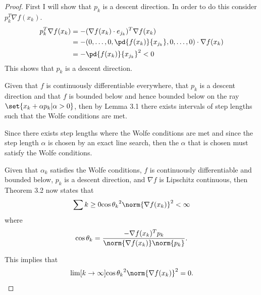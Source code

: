 \documentclass[11pt, oneside]{article}
\begin{document}
\begin{enumerate}
\begin{enumerate}
        \begin{proof}
          First I will show that $p_k$ is a descent direction.
          In order to do this consider $p_k^T \nabla f(x_k)$.
          \begin{align*}
            p_k^T \nabla f(x_k) &= - (\nabla f(x_k) \cdot e_{j_k})^T \nabla f(x_k) \\
            &= -(0, \ldots, 0, \pd{f(x_k)}{x_{j_k}}, 0, \ldots, 0) \cdot \nabla f(x_k) \\
            &= - \pd{f(x_k)}{x_{j_k}}^2 < 0
          \end{align*}
          This shows that $p_k$ is a descent direction.

          Given that $f$ is continuously differentiable everywhere, that $p_k$ is
          a descent direction and that $f$ is bounded below and hence bounded
          below on the ray $\set{x_k + \alpha p_k | \alpha > 0}$, then by Lemma
          3.1 there exists intervals of step lengths such that the Wolfe
          conditions are met.

          Since there exists step lengths where the Wolfe conditions are met
          and since the step length $\alpha$ is chosen by an exact line search,
          then the $\alpha$ that is chosen must satisfy the Wolfe conditions.

          Given that $\alpha_k$ satisfies the Wolfe conditions, $f$ is
          continuously differentiable and bounded below, $p_k$ is a descent
          direction, and $\nabla f$ is Lipschitz continuous, then Theorem 3.2
          now states that
          \[
            \sum{k \ge 0}{}{\cos{\theta_k}^2 \norm{\nabla f(x_k)}^2} < \infty
          \]
          where
          \[
            \cos{\theta_k} = \frac{-\nabla f(x_k)^T p_k}{\norm{\nabla f(x_k)} \norm{p_k}}.
          \]

          This implies that
          \[
            \lim[k \to \infty]{\cos{\theta_k}^2 \norm{\nabla f(x_k)}^2} = 0.
          \]


\end{proof}
\end{enumerate}
\end{enumerate}
\end{document}
